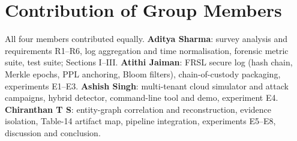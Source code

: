 \documentclass[conference,10pt]{IEEEtran}
\begin{document}
\section*{Contribution of Group Members}
All four members contributed equally. \textbf{Aditya Sharma}: survey analysis and requirements R1--R6, log aggregation and time normalisation, forensic metric suite, test suite; Sections I--III. \textbf{Atithi Jaiman}: FRSL secure log (hash chain, Merkle epochs, PPL anchoring, Bloom filters), chain-of-custody packaging, experiments E1--E3. \textbf{Ashish Singh}: multi-tenant cloud simulator and attack campaigns, hybrid detector, command-line tool and demo, experiment E4. \textbf{Chiranthan T S}: entity-graph correlation and reconstruction, evidence isolation, Table-14 artifact map, pipeline integration, experiments E5--E8, discussion and conclusion.
\end{document}
